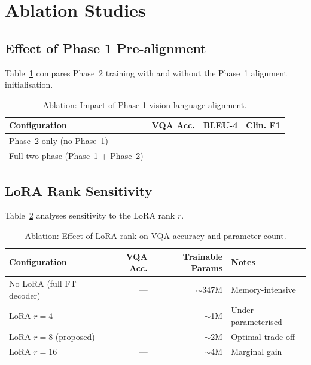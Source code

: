 \section{Ablation Studies}
\label{sec:ablation}

\subsection{Effect of Phase 1 Pre-alignment}
\label{subsec:abl_phase1}

Table~\ref{tab:abl_phase} compares Phase~2 training with and without the
Phase~1 alignment initialisation.

\begin{table}[htbp]
\centering
\caption{Ablation: Impact of Phase 1 vision-language alignment.}
\label{tab:abl_phase}
\begin{tabular}{@{}lccc@{}}
\toprule
\textbf{Configuration} & \textbf{VQA Acc.} & \textbf{BLEU-4} & \textbf{Clin. F1} \\
\midrule
Phase~2 only (no Phase~1)            & --- & --- & --- \\
Full two-phase (Phase~1 + Phase~2)   & --- & --- & --- \\
\bottomrule
\end{tabular}
\end{table}

\subsection{LoRA Rank Sensitivity}
\label{subsec:abl_lora}

Table~\ref{tab:abl_lora} analyses sensitivity to the LoRA rank $r$.

\begin{table}[htbp]
\centering
\caption{Ablation: Effect of LoRA rank on VQA accuracy and parameter count.}
\label{tab:abl_lora}
\begin{tabular}{@{}lrrl@{}}
\toprule
\textbf{Configuration} & \textbf{VQA Acc.} & \textbf{Trainable Params} & \textbf{Notes} \\
\midrule
No LoRA (full FT decoder)  & ---  & $\sim$347M & Memory-intensive \\
LoRA $r=4$                 & ---  & $\sim$1M   & Under-parameterised \\
LoRA $r=8$ (proposed)      & ---  & $\sim$2M   & Optimal trade-off \\
LoRA $r=16$                & ---  & $\sim$4M   & Marginal gain \\
\bottomrule
\end{tabular}
\end{table}

